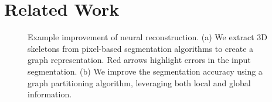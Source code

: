 
\section{Related Work}

\begin{figure}[t]
	\caption{Example improvement of neural reconstruction. (a) We extract 3D skeletons from pixel-based segmentation algorithms to create a graph representation. Red arrows highlight errors in the input segmentation. (b) We improve the segmentation accuracy using a graph partitioning algorithm, leveraging both local and global information.}
	\label{fig:improved-reconstruction}
\end{figure}


